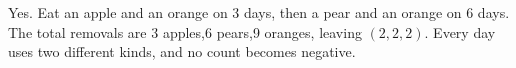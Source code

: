 Yes. Eat an apple and an orange on 3 days, then a pear and an orange on 6 days. The total removals are 3 apples,6 pears,9 oranges, leaving $\boxed{(2,2,2)}$. Every day uses two different kinds, and no count becomes negative.
